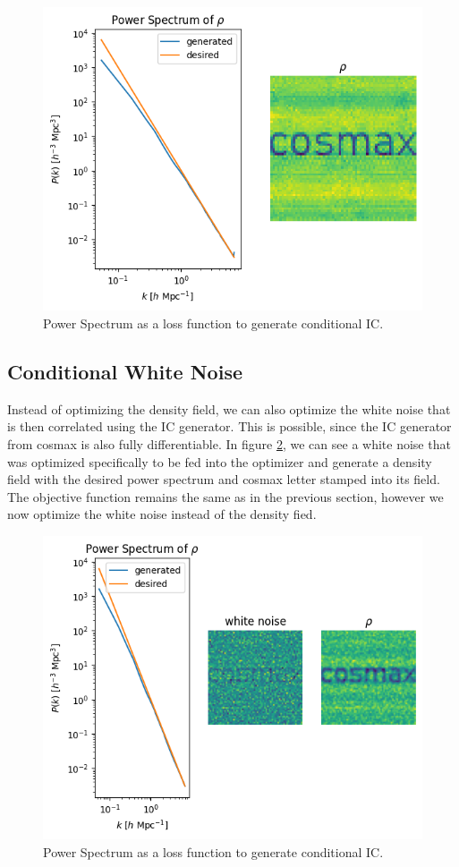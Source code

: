 \documentclass{article}
\begin{document}
{\begin{appendices}
\begin{figure}[h]
    \centering
    \includegraphics[width=0.5\linewidth]{img/cond_ic.png}
    \caption{Power Spectrum as a loss function to generate conditional IC.}
    \label{fig:cosmax-cosmax}
\end{figure}

\subsection{Conditional White Noise}
\label{white-noise}

Instead of optimizing the density field, we can also optimize the white noise that is then correlated using the IC generator. This is possible, since the IC generator from cosmax is also fully differentiable. In figure \ref{fig:cosmax-white-noise}, we can see a white noise that was optimized specifically to be fed into the optimizer and generate a density field with the desired power spectrum and cosmax letter stamped into its field. The objective function remains the same as in the previous section, however we now optimize the white noise instead of the density fied.

\begin{figure}[h]
    \centering
    \includegraphics[width=0.5\linewidth]{img/cond_ic_2.png}
    \caption{Power Spectrum as a loss function to generate conditional IC.}
    \label{fig:cosmax-white-noise}
\end{figure}


\end{appendices}}
\end{document}
